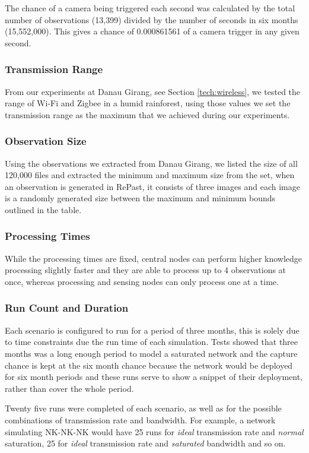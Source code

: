 	The chance of a camera being triggered each second was calculated by the total number of observations (13,399) divided by the number of seconds in six months (15,552,000). This gives a chance of 0.000861561 of a camera trigger in any given second.

	\subsubsection{Transmission Range}
	From our experiments at Danau Girang, see Section \ref{tech:wireless}, we tested the range of Wi-Fi and Zigbee in a humid rainforest, using those values we set the transmission range as the maximum that we achieved during our experiments.

	\subsubsection{Observation Size}
	Using the observations we extracted from Danau Girang, we listed the size of all 120,000 files and extracted the minimum and maximum size from the set, when an observation is generated in RePast, it consists of three images and each image is a randomly generated size between the maximum and minimum bounds outlined in the table.

	\subsubsection{Processing Times}
	While the processing times are fixed, central nodes can perform higher knowledge processing slightly faster and they are able to process up to 4 observations at once, whereas processing and sensing nodes can only process one at a time.
	
	\subsubsection{Run Count and Duration}
	Each scenario is configured to run for a period of three months, this is solely due to time constraints due the run time of each simulation. Tests showed that three months was a long enough period to model a saturated network and the capture chance is kept at the six month chance because the network would be deployed for six month periods and these runs serve to show a snippet of their deployment, rather than cover the whole period.
	
	Twenty five runs were completed of each scenario, as well as for the possible combinations of transmission rate and bandwidth. For example, a network simulating NK-NK-NK would have 25 runs for \textit{ideal} transmission rate and \textit{normal} saturation, 25 for \textit{ideal} transmission rate and \textit{saturated} bandwidth and so on.

